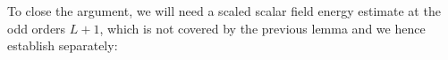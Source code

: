 \documentclass[11pt,leqno,textwidth=10cm]{amsart}
\numberwithin{equation}{section}
\theoremstyle{definition}
\newtheorem{remark}[definition]{Remark}
\theoremstyle{plain}
\newcommand{\1}{\mathbbm{1}}
\newcommand{\E}{\mathcal{E}}
\newcommand{\change}[1]{\color{black}#1\color{black}}
\newcommand{\delete}[1]{}
\begin{document}

To close the \change{argument}, we will need a scaled scalar field energy estimate at the \change{odd orders $L+1$}, which is not covered by the previous lemma and we hence establish separately:

\end{document}
